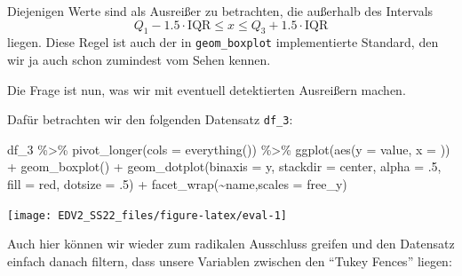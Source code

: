 \documentclass[
]{book}
\newenvironment{Shaded}{\begin{snugshade}}{\end{snugshade}}
\newcommand{\AttributeTok}[1]{\textcolor[rgb]{0.77,0.63,0.00}{#1}}
\newcommand{\DecValTok}[1]{\textcolor[rgb]{0.00,0.00,0.81}{#1}}
\newcommand{\FunctionTok}[1]{\textcolor[rgb]{0.00,0.00,0.00}{#1}}
\newcommand{\NormalTok}[1]{#1}
\newcommand{\SpecialCharTok}[1]{\textcolor[rgb]{0.00,0.00,0.00}{#1}}
\newcommand{\StringTok}[1]{\textcolor[rgb]{0.31,0.60,0.02}{#1}}
\begin{document}
Diejenigen Werte sind als Ausreißer zu betrachten, die außerhalb des Intervals
\[Q_1 - 1.5 \cdot \text{IQR} \leq x \leq Q_3 + 1.5 \cdot \text{IQR}\]
liegen. Diese Regel ist auch der in \texttt{geom\_boxplot} implementierte Standard, den wir ja auch schon zumindest vom Sehen kennen.

Die Frage ist nun, was wir mit eventuell detektierten Ausreißern machen.

Dafür betrachten wir den folgenden Datensatz \texttt{df\_3}:

\begin{Shaded}
\begin{Highlighting}[]
\NormalTok{df\_3 }\SpecialCharTok{\%\textgreater{}\%} 
  \FunctionTok{pivot\_longer}\NormalTok{(}\AttributeTok{cols =} \FunctionTok{everything}\NormalTok{()) }\SpecialCharTok{\%\textgreater{}\%} 
  \FunctionTok{ggplot}\NormalTok{(}\FunctionTok{aes}\NormalTok{(}\AttributeTok{y =}\NormalTok{ value, }\AttributeTok{x =} \StringTok{\textquotesingle{}\textquotesingle{}}\NormalTok{)) }\SpecialCharTok{+}
  \FunctionTok{geom\_boxplot}\NormalTok{() }\SpecialCharTok{+}
  \FunctionTok{geom\_dotplot}\NormalTok{(}\AttributeTok{binaxis =} \StringTok{\textquotesingle{}y\textquotesingle{}}\NormalTok{,}
               \AttributeTok{stackdir =} \StringTok{\textquotesingle{}center\textquotesingle{}}\NormalTok{,}
               \AttributeTok{alpha =}\NormalTok{ .}\DecValTok{5}\NormalTok{,}
               \AttributeTok{fill =} \StringTok{\textquotesingle{}red\textquotesingle{}}\NormalTok{,}
               \AttributeTok{dotsize =}\NormalTok{ .}\DecValTok{5}\NormalTok{) }\SpecialCharTok{+}
  \FunctionTok{facet\_wrap}\NormalTok{(}\SpecialCharTok{\textasciitilde{}}\NormalTok{name,}\AttributeTok{scales =} \StringTok{\textquotesingle{}free\_y\textquotesingle{}}\NormalTok{)}
\end{Highlighting}
\end{Shaded}

\begin{center}\texttt{[image: EDV2\_SS22\_files/figure-latex/eval-1]} \end{center}

Auch hier können wir wieder zum radikalen Ausschluss greifen und den Datensatz einfach danach filtern, dass unsere Variablen zwischen den ``Tukey Fences'' liegen:
\end{document}
